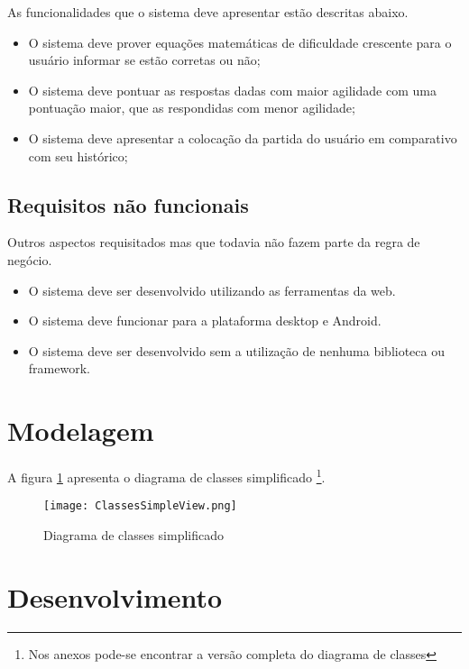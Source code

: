 As funcionalidades que o sistema deve apresentar estão descritas abaixo.

\begin{itemize}
    \item O sistema deve prover equações matemáticas de dificuldade crescente para o usuário informar se estão corretas ou não;
    \item O sistema deve pontuar as respostas dadas com maior agilidade com uma pontuação maior, que as respondidas com menor agilidade;
    \item O sistema deve apresentar a colocação da partida do usuário em comparativo com seu histórico;
\end{itemize}

\subsection{Requisitos não funcionais}

Outros aspectos requisitados mas que todavia não fazem parte da regra de negócio.

\begin{itemize}
    \item O sistema deve ser desenvolvido utilizando as ferramentas da web.
    \item O sistema deve funcionar para a plataforma desktop e Android.
    \item O sistema deve ser desenvolvido sem a utilização de nenhuma biblioteca ou framework.
\end{itemize}

\section{Modelagem}

A figura \ref{fig:simpleDiagram} apresenta o diagrama de classes
simplificado \footnote{Nos anexos pode-se encontrar a versão completa
do diagrama de classes}.

\begin{figure}
    \centering
    \texttt{[image: ClassesSimpleView.png]}
	\caption{Diagrama de classes simplificado}
    \label{fig:simpleDiagram}
\end{figure}

\section{Desenvolvimento}

